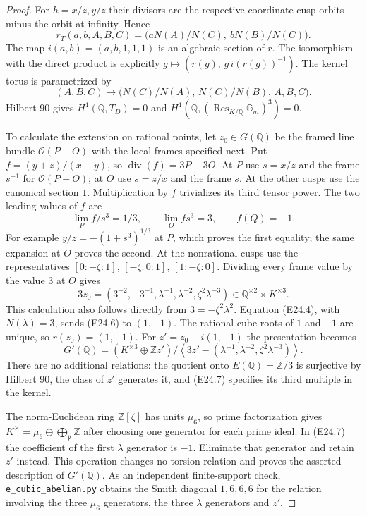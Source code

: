 \begin{proof}
For $h=x/z,y/z$ their divisors are the respective coordinate-cusp
orbits minus the orbit at infinity. Hence
\[
 r_T(a,b,A,B,C)
  =\bigl(aN(A)/N(C),\ bN(B)/N(C)\bigr).
 \tag{E24.4}
\]
The map $i(a,b)=(a,b,1,1,1)$ is an algebraic section of $r$.
The isomorphism with the direct product is explicitly
$g\mapsto(r(g),\,g\,i(r(g))^{-1})$.
The kernel torus is parametrized by
\[
 (A,B,C)\longmapsto
 \bigl(N(C)/N(A),\,N(C)/N(B),\,A,B,C\bigr).
 \tag{E24.5}
\]
Hilbert 90 gives $H^1(\mathbb Q,T_D)=0$ and
$H^1(\mathbb Q,(\operatorname{Res}_{K/\mathbb Q}\mathbb G_m)^3)=0$.

To calculate the extension on rational points, let $z_0\in G(\mathbb Q)$
be the framed line bundle $\mathcal O(P-O)$ with the local frames
specified next. Put
$f=(y+z)/(x+y)$, so
$\operatorname{div}(f)=3P-3O$.
At $P$ use $s=x/z$ and the frame $s^{-1}$ for
$\mathcal O(P-O)$; at $O$ use $s=z/x$ and the frame $s$.
At the other cusps use the canonical section $1$.
Multiplication by $f$ trivializes its third tensor power.
The two leading values of $f$ are
\[
 \lim_{P}f/s^3=1/3,\qquad
 \lim_{O}fs^3=3,\qquad f(Q)=-1 .
\]
For example $y/z=-(1+s^3)^{1/3}$ at $P$, which proves the
first equality; the same expansion at $O$ proves the second.
At the nonrational cusps use the representatives
$[0:-\zeta:1]$, $[-\zeta:0:1]$, $[1:-\zeta:0]$.
Dividing every frame value by the value $3$ at $O$ gives
\[
 3z_0=
 \left(3^{-2},-3^{-1},
             \lambda^{-1},\lambda^{-2},\zeta^2\lambda^{-3}\right)
       \in\mathbb Q^{\times2}\times K^{\times3}.
 \tag{E24.6}
\]
This calculation also follows directly from
$3=-\zeta^2\lambda^2$.
Equation (E24.4), with $N(\lambda)=3$, sends (E24.6) to $(1,-1)$.
The rational cube roots of $1$ and $-1$ are unique, so
$r(z_0)=(1,-1)$.
For $z'=z_0-i(1,-1)$ the presentation becomes
\[
 G'(\mathbb Q)=
 (K^{\times3}\oplus\mathbb Z z')/
 \left\langle 3z'-
   (\lambda^{-1},\lambda^{-2},\zeta^2\lambda^{-3})\right\rangle .
 \tag{E24.7}
\]
There are no additional relations: the quotient onto
$E(\mathbb Q)=\mathbb Z/3$ is surjective by Hilbert 90, the class of
$z'$ generates it, and (E24.7) specifies its third multiple in the
kernel.

The norm-Euclidean ring $\mathbb Z[\zeta]$ has units $\mu_6$,
so prime factorization gives
$K^\times=\mu_6\oplus\bigoplus_{\mathfrak p}\mathbb Z$ after choosing
one generator for each prime ideal. In (E24.7) the coefficient of
the first $\lambda$ generator is $-1$. Eliminate that generator
and retain $z'$ instead. This operation changes no torsion relation
and proves the asserted description of $G'(\mathbb Q)$.
As an independent finite-support check,
\texttt{e\_cubic\_abelian.py} obtains the Smith diagonal
$1,6,6,6$ for the relation involving the three $\mu_6$ generators,
the three $\lambda$ generators and $z'$.


\end{proof}
